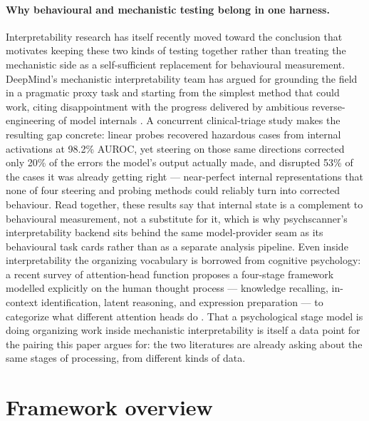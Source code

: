 \documentclass[11pt]{article}
\begin{document}
\paragraph{Why behavioural and mechanistic testing belong in one harness.}
Interpretability research has itself recently moved toward the conclusion
that motivates keeping these two kinds of testing together rather than
treating the mechanistic side as a self-sufficient replacement for
behavioural measurement. DeepMind's mechanistic interpretability team has
argued for grounding the field in a pragmatic proxy task and starting from
the simplest method that could work, citing disappointment with the
progress delivered by ambitious reverse-engineering of model internals
\citep{nanda2025pragmatic}. A concurrent clinical-triage study makes the
resulting gap concrete: linear probes recovered hazardous cases from
internal activations at 98.2\% AUROC, yet steering on those same
directions corrected only 20\% of the errors the model's output actually
made, and disrupted 53\% of the cases it was already getting right
\citep{basu2026actionability} --- near-perfect internal representations
that none of four steering and probing methods could reliably turn into
corrected behaviour. Read together, these results say that internal state
is a complement to behavioural measurement, not a substitute for it, which
is why psychscanner's interpretability backend sits behind the same
model-provider seam as its behavioural task cards rather than as a
separate analysis pipeline. Even inside interpretability the organizing
vocabulary is borrowed from cognitive psychology: a recent survey of
attention-head function proposes a four-stage framework modelled
explicitly on the human thought process --- knowledge recalling,
in-context identification, latent reasoning, and expression preparation
--- to categorize what different attention heads do
\citep{zheng2025attentionheads}. That a psychological stage model is doing
organizing work inside mechanistic interpretability is itself a data point
for the pairing this paper argues for: the two literatures are already
asking about the same stages of processing, from different kinds of data.

\section{Framework overview}
\end{document}
